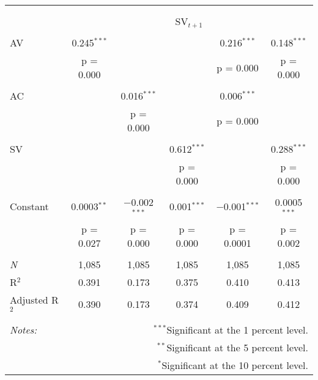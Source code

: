 
\begin{tabular}{@{\extracolsep{5pt}}lccccc} 
\\[-1.8ex]\hline 
\hline \\[-1.8ex] 
\\[-1.8ex] & \multicolumn{5}{c}{SV$_{t+1}$} \\ 
\hline \\[-1.8ex] 
 AV & 0.245$^{***}$ &  &  & 0.216$^{***}$ & 0.148$^{***}$ \\ 
  & p = 0.000 &  &  & p = 0.000 & p = 0.000 \\ 
  & & & & & \\ 
 AC &  & 0.016$^{***}$ &  & 0.006$^{***}$ &  \\ 
  &  & p = 0.000 &  & p = 0.000 &  \\ 
  & & & & & \\ 
 SV &  &  & 0.612$^{***}$ &  & 0.288$^{***}$ \\ 
  &  &  & p = 0.000 &  & p = 0.000 \\ 
  & & & & & \\ 
 Constant & 0.0003$^{**}$ & $-$0.002$^{***}$ & 0.001$^{***}$ & $-$0.001$^{***}$ & 0.0005$^{***}$ \\ 
  & p = 0.027 & p = 0.000 & p = 0.000 & p = 0.0001 & p = 0.002 \\ 
  & & & & & \\ 
\textit{N} & 1,085 & 1,085 & 1,085 & 1,085 & 1,085 \\ 
R$^{2}$ & 0.391 & 0.173 & 0.375 & 0.410 & 0.413 \\ 
Adjusted R$^{2}$ & 0.390 & 0.173 & 0.374 & 0.409 & 0.412 \\ 
\hline 
\hline \\[-1.8ex] 
\textit{Notes:} & \multicolumn{5}{r}{$^{***}$Significant at the 1 percent level.} \\ 
 & \multicolumn{5}{r}{$^{**}$Significant at the 5 percent level.} \\ 
 & \multicolumn{5}{r}{$^{*}$Significant at the 10 percent level.} \\ 
\end{tabular} 
